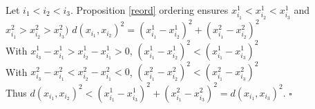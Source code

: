 \documentclass{meta}
\def\RR{{\mathbb{R}}}
\begin{document}
 Let $ i_1<i_2<i_3$. Proposition \ref{reord} ordering ensures
$x^1_{i_1} < x^1_{i_2} < x^1_{i_3}$ and $x^2_{i_1} > x^2_{i_2} > x^2_{i_3})$
$d(x_{i_1},x_{i_2})^2 = {(x^1_{i_1} - x^1_{i_2})^2 + (x^2_{i_1} - x^2_{i_2})^2}$\\
With $x^1_{i_3} - x^1_{i_1} > x^1_{i_2} - x^1_{i_1}>0$, $(x^1_{i_1} - x^1_{i_2})^2 < (x^1_{i_1} - x^1_{i_3})^2$\\
With $x^2_{i_3} - x^2_{i_1} < x^2_{i_2} - x^2_{i_1}<0$, $(x^2_{i_1} - x^2_{i_2})^2 < (x^2_{i_1} - x^2_{i_3})^2$\\
Thus $d(x_{i_1},x_{i_2})^2 < {(x^1_{i_1} - x^1_{i_3})^2 + (x^2_{i_1} - x^2_{i_3})^2} = d(x_{i_1},x_{i_3})^2$. $\square$








% 

\end{document}
